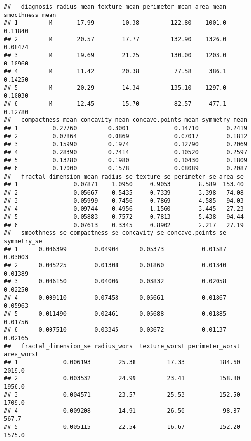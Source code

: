 \documentclass[
]{article}
\begin{document}
\begin{verbatim}
##   diagnosis radius_mean texture_mean perimeter_mean area_mean smoothness_mean
## 1         M       17.99        10.38         122.80    1001.0         0.11840
## 2         M       20.57        17.77         132.90    1326.0         0.08474
## 3         M       19.69        21.25         130.00    1203.0         0.10960
## 4         M       11.42        20.38          77.58     386.1         0.14250
## 5         M       20.29        14.34         135.10    1297.0         0.10030
## 6         M       12.45        15.70          82.57     477.1         0.12780
##   compactness_mean concavity_mean concave.points_mean symmetry_mean
## 1          0.27760         0.3001             0.14710        0.2419
## 2          0.07864         0.0869             0.07017        0.1812
## 3          0.15990         0.1974             0.12790        0.2069
## 4          0.28390         0.2414             0.10520        0.2597
## 5          0.13280         0.1980             0.10430        0.1809
## 6          0.17000         0.1578             0.08089        0.2087
##   fractal_dimension_mean radius_se texture_se perimeter_se area_se
## 1                0.07871    1.0950     0.9053        8.589  153.40
## 2                0.05667    0.5435     0.7339        3.398   74.08
## 3                0.05999    0.7456     0.7869        4.585   94.03
## 4                0.09744    0.4956     1.1560        3.445   27.23
## 5                0.05883    0.7572     0.7813        5.438   94.44
## 6                0.07613    0.3345     0.8902        2.217   27.19
##   smoothness_se compactness_se concavity_se concave.points_se symmetry_se
## 1      0.006399        0.04904      0.05373           0.01587     0.03003
## 2      0.005225        0.01308      0.01860           0.01340     0.01389
## 3      0.006150        0.04006      0.03832           0.02058     0.02250
## 4      0.009110        0.07458      0.05661           0.01867     0.05963
## 5      0.011490        0.02461      0.05688           0.01885     0.01756
## 6      0.007510        0.03345      0.03672           0.01137     0.02165
##   fractal_dimension_se radius_worst texture_worst perimeter_worst area_worst
## 1             0.006193        25.38         17.33          184.60     2019.0
## 2             0.003532        24.99         23.41          158.80     1956.0
## 3             0.004571        23.57         25.53          152.50     1709.0
## 4             0.009208        14.91         26.50           98.87      567.7
## 5             0.005115        22.54         16.67          152.20     1575.0

\end{verbatim}
\end{document}
